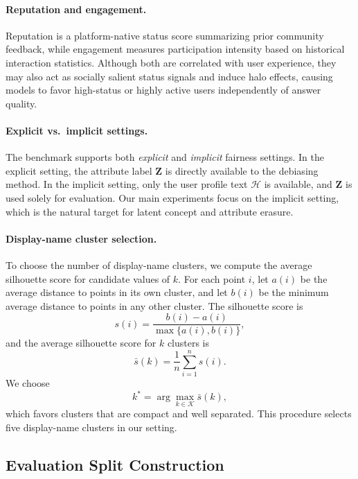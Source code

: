 \documentclass[11pt]{article}
\newcommand{\rv}[1]{\mathbf{#1}}
\begin{document}
\paragraph{Reputation and engagement.}
Reputation is a platform-native status score summarizing prior community feedback, while engagement measures participation intensity based on historical interaction statistics. Although both are correlated with user experience, they may also act as socially salient status signals and induce halo effects, causing models to favor high-status or highly active users independently of answer quality.


\paragraph{Explicit vs.\ implicit settings.}
The benchmark supports both \emph{explicit} and \emph{implicit} fairness settings. In the explicit setting, the attribute label $\rv{Z}$ is directly available to the debiasing method. In the implicit setting, only the user profile text $\mathcal{H}$ is available, and $\rv{Z}$ is used solely for evaluation. Our main experiments focus on the implicit setting, which is the natural target for latent concept and attribute erasure.

\paragraph{Display-name cluster selection.}
To choose the number of display-name clusters, we compute the average silhouette score for candidate values of $k$. For each point $i$, let $a(i)$ be the average distance to points in its own cluster, and let $b(i)$ be the minimum average distance to points in any other cluster. The silhouette score is
\[
s(i)=\frac{b(i)-a(i)}{\max\{a(i),b(i)\}},
\]
and the average silhouette score for $k$ clusters is
\[
\bar{s}(k)=\frac{1}{n}\sum_{i=1}^{n}s(i).
\]
We choose
\[
k^*=\arg\max_{k\in\mathcal{K}}\bar{s}(k),
\]
which favors clusters that are compact and well separated. This procedure selects five display-name clusters in our setting.















\subsection{Evaluation Split Construction}
\label{app:split-details}
\end{document}
